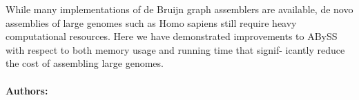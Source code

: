 While many implementations of de Bruijn graph assemblers are available,
de novo assemblies of large genomes such as Homo sapiens still require
heavy computational resources. Here we have demonstrated improvements
to ABySS with respect to both memory usage and running time that signif-
icantly reduce the cost of assembling large genomes.


\noindent \paragraph{Authors:} 

